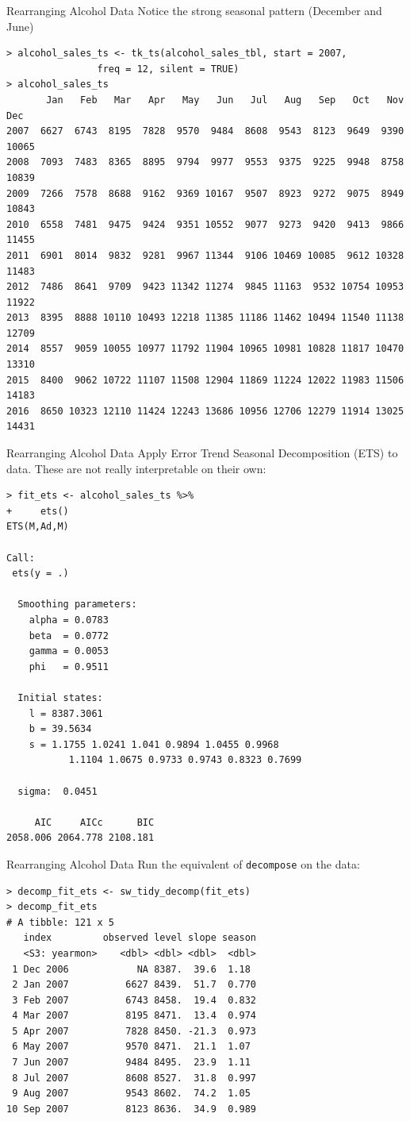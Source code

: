 \documentclass[aspectratio=169]{beamer}
\begin{document}
\begin{frame}[fragile]{Rearranging Alcohol Data}
Notice the strong seasonal pattern (December and June)
\footnotesize
\begin{verbatim}
> alcohol_sales_ts <- tk_ts(alcohol_sales_tbl, start = 2007, 
				freq = 12, silent = TRUE)
> alcohol_sales_ts
       Jan   Feb   Mar   Apr   May   Jun   Jul   Aug   Sep   Oct   Nov   Dec
2007  6627  6743  8195  7828  9570  9484  8608  9543  8123  9649  9390 10065
2008  7093  7483  8365  8895  9794  9977  9553  9375  9225  9948  8758 10839
2009  7266  7578  8688  9162  9369 10167  9507  8923  9272  9075  8949 10843
2010  6558  7481  9475  9424  9351 10552  9077  9273  9420  9413  9866 11455
2011  6901  8014  9832  9281  9967 11344  9106 10469 10085  9612 10328 11483
2012  7486  8641  9709  9423 11342 11274  9845 11163  9532 10754 10953 11922
2013  8395  8888 10110 10493 12218 11385 11186 11462 10494 11540 11138 12709
2014  8557  9059 10055 10977 11792 11904 10965 10981 10828 11817 10470 13310
2015  8400  9062 10722 11107 11508 12904 11869 11224 12022 11983 11506 14183
2016  8650 10323 12110 11424 12243 13686 10956 12706 12279 11914 13025 14431
\end{verbatim}
\end{frame}

\begin{frame}[fragile]{Rearranging Alcohol Data}
Apply \alert{Error Trend Seasonal} Decomposition (ETS) to data. These are not really interpretable on their own:
\tiny
\begin{verbatim}
> fit_ets <- alcohol_sales_ts %>%
+     ets()
ETS(M,Ad,M) 

Call:
 ets(y = .) 

  Smoothing parameters:
    alpha = 0.0783 
    beta  = 0.0772 
    gamma = 0.0053 
    phi   = 0.9511 

  Initial states:
    l = 8387.3061 
    b = 39.5634 
    s = 1.1755 1.0241 1.041 0.9894 1.0455 0.9968
           1.1104 1.0675 0.9733 0.9743 0.8323 0.7699

  sigma:  0.0451

     AIC     AICc      BIC 
2058.006 2064.778 2108.181 
\end{verbatim}
\end{frame}


\begin{frame}[fragile]{Rearranging Alcohol Data}
Run the equivalent of \texttt{decompose} on the data:
\footnotesize
\begin{verbatim}
> decomp_fit_ets <- sw_tidy_decomp(fit_ets)
> decomp_fit_ets 
# A tibble: 121 x 5
   index         observed level slope season
   <S3: yearmon>    <dbl> <dbl> <dbl>  <dbl>
 1 Dec 2006            NA 8387.  39.6  1.18 
 2 Jan 2007          6627 8439.  51.7  0.770
 3 Feb 2007          6743 8458.  19.4  0.832
 4 Mar 2007          8195 8471.  13.4  0.974
 5 Apr 2007          7828 8450. -21.3  0.973
 6 May 2007          9570 8471.  21.1  1.07 
 7 Jun 2007          9484 8495.  23.9  1.11 
 8 Jul 2007          8608 8527.  31.8  0.997
 9 Aug 2007          9543 8602.  74.2  1.05 
10 Sep 2007          8123 8636.  34.9  0.989
\end{verbatim}
\end{frame}
\end{document}
